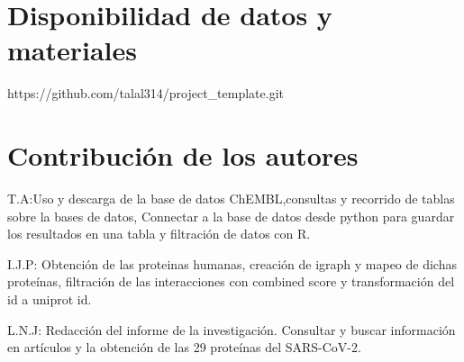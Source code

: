 \documentclass{bmcart}
\begin{document}
	\begin{backmatter}
		
		\section*{Disponibilidad de datos y materiales}%
			https://github.com/talal314/project_template.git
		
		\section*{Contribución de los autores}
			T.A:Uso y descarga de la base de datos ChEMBL,consultas y recorrido de tablas sobre la bases de datos, Connectar a la base de datos desde python para guardar los resultados en una tabla y filtración de datos con R. 
			
			I.J.P: Obtención de las proteinas humanas, creación de igraph y mapeo de dichas proteínas, filtración de las interacciones con combined score y transformación del id a uniprot id. 
			
			L.N.J: Redacción del informe de la investigación. Consultar y buscar información en artículos y la obtención de las 29 proteínas del SARS-CoV-2. 
		
		
		
	
	\end{backmatter}
\end{document}
